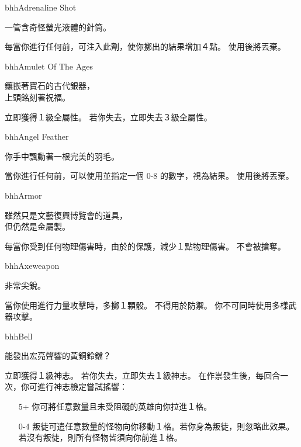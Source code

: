 %
\begin{ItemCard}{bhh}{Adrenaline Shot}{}
  \begin{CardStory}
    一管含奇怪螢光液體的針筒。
  \end{CardStory}
  每當你進行任何前，可注入此劑，使你擲出的結果增加４點。 \smallbreak
  使用後將\ThisName{}丟棄。\smallbreak
\end{ItemCard}%
\linebreak[0]%
\begin{ItemCard}{bhh}{Amulet Of The Ages}{}
  \begin{CardStory}
    鑲嵌著寶石的古代銀器，\\
    上頭銘刻著祝福。
  \end{CardStory}
  立即獲得１級全屬性。\smallbreak
  若你失去\ThisName{}，立即失去３級全屬性。\smallbreak
\end{ItemCard}%
\linebreak[0]%
\begin{ItemCard}{bhh}{Angel Feather}{}
  \begin{CardStory}
    你手中飄動著一根完美的羽毛。
  \end{CardStory}
  當你進行任何\RollAny{}前，可以使用\ThisName{}並指定一個 0-8 的數字，視為\RollAny{}結果。\smallbreak
  使用後將\ThisName{}丟棄。\smallbreak
\end{ItemCard}%
\linebreak[0]%
\begin{ItemCard}{bhh}{Armor}{}
  \begin{CardStory}
    雖然只是文藝復興博覽會的道具，\\
    但仍然是金屬製。
  \end{CardStory}
  每當你受到任何物理傷害時，由於\ThisName{}的保護，減少１點物理傷害。\smallbreak
  \ThisName{}不會被搶奪。\smallbreak
\end{ItemCard}%
\linebreak[0]%
\begin{ItemCard}{bhh}{Axe}{weapon}
  \begin{CardStory}
    非常尖銳。
  \end{CardStory}
  當你使用\ThisName{}進行力量攻擊時，多擲１顆骰。\smallbreak
  \ThisName{}不得用於防禦。\smallbreak
  你不可同時使用多樣武器攻擊。\smallbreak
\end{ItemCard}%
\linebreak[0]%
\begin{ItemCard}{bhh}{Bell}{}
  \begin{CardStory}
    能發出宏亮聲響的黃銅鈴鐺？
  \end{CardStory}
  立即獲得１級神志。\smallbreak
  若你失去\ThisName{}，立即失去１級神志。\smallbreak
  在作祟發生後，每回合一次，你可進行神志檢定嘗試搖響\ThisName{}：
  \begin{itemize}
    \item[5+] 你可將任意數量且未受阻礙的英雄向你拉進１格。
    \item[0-4] 叛徒可遣任意數量的怪物向你移動１格。若你身為叛徒，則忽略此效果。若沒有叛徒，則所有怪物皆須向你前進１格。
  \end{itemize}
\end{ItemCard}%

